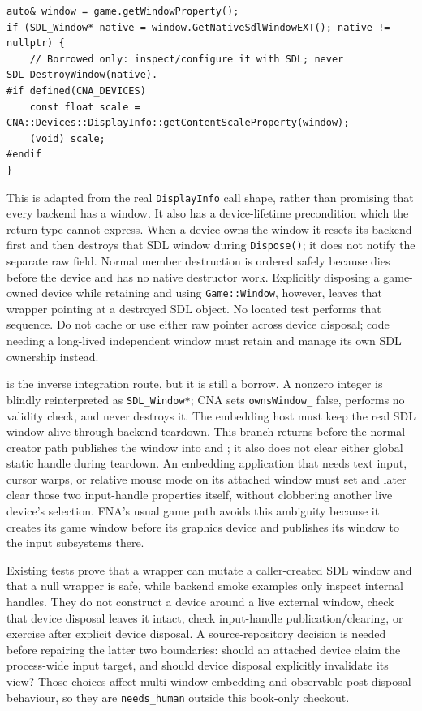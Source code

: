 \begin{lstlisting}
auto& window = game.getWindowProperty();
if (SDL_Window* native = window.GetNativeSdlWindowEXT(); native != nullptr) {
    // Borrowed only: inspect/configure it with SDL; never SDL_DestroyWindow(native).
#if defined(CNA_DEVICES)
    const float scale = CNA::Devices::DisplayInfo::getContentScaleProperty(window);
    (void) scale;
#endif
}
\end{lstlisting}

This is adapted from the real \texttt{DisplayInfo} call shape, rather than promising that every
backend has a window. It also has a device-lifetime precondition which the return type cannot
express. When a device owns the window it resets its backend first and then destroys that SDL
window during \texttt{Dispose()}; it does not notify the separate  raw
field. Normal  member destruction is ordered safely because 
dies before the device and has no native destructor work. Explicitly disposing a game-owned
device while retaining and using \texttt{Game::Window}, however, leaves that wrapper pointing at
a destroyed SDL object. No located test performs that sequence. Do not cache or use either raw
pointer across device disposal; code needing a long-lived independent window must retain and
manage its own SDL ownership instead.

 is the inverse integration route, but it
is still a borrow. A nonzero integer is blindly reinterpreted as \texttt{SDL\_Window*}; CNA sets
\texttt{ownsWindow\_} false, performs no validity check, and never destroys it. The embedding
host must keep the real SDL window alive through backend teardown. This branch returns before
the normal creator path publishes the window into  and
; it also does not clear either global static handle during teardown.
An embedding application that needs text input, cursor warps, or relative mouse mode on its
attached window must set and later clear those two input-handle properties itself, without
clobbering another live device's selection. FNA's usual game path avoids this ambiguity because
it creates its game window before its graphics device and publishes its window to the input
subsystems there.

Existing  tests prove that a wrapper can mutate a caller-created SDL window
and that a null wrapper is safe, while backend smoke examples only inspect internal handles.
They do not construct a device around a live external window, check that device disposal leaves
it intact, check input-handle publication/clearing, or exercise  after
explicit device disposal. A source-repository decision is needed before repairing the latter two
boundaries: should an attached device claim the process-wide input target, and should device
disposal explicitly invalidate its  view? Those choices affect multi-window
embedding and observable post-disposal behaviour, so they are \texttt{needs\_human} outside this
book-only checkout.

